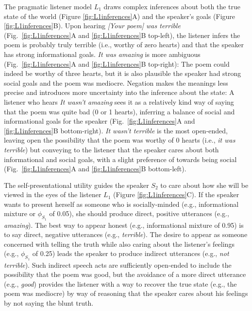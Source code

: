 \documentclass[9pt,twocolumn,twoside,lineno]{main_class_file}
\begin{document}
The pragmatic listener model \(L_1\) draws complex inferences about both the true state of the world (Figure \ref{fig:L1inferences}A) and the speaker's goals (Figure \ref{fig:L1inferences}B).
Upon hearing \emph{{[}Your poem{]} was terrible} (Fig.~\ref{fig:L1inferences}A and \ref{fig:L1inferences}B top-left), the listener infers the poem is probably truly terrible (i.e., worthy of zero hearts) and that the speaker has strong informational goals.
\emph{It was amazing} is more ambiguous (Fig.~\ref{fig:L1inferences}A and \ref{fig:L1inferences}B top-right): The poem could indeed be worthy of three hearts, but it is also plausible the speaker had strong social goals and the poem was mediocre. 
Negation makes the meanings less precise and introduces more uncertainty into the inference about the state: A listener who hears \emph{It wasn't amazing} sees it as a relatively kind way of saying that the poem was quite bad (0 or 1 hearts), inferring a balance of social and informational goals for the speaker (Fig.~\ref{fig:L1inferences}A and \ref{fig:L1inferences}B bottom-right).
\emph{It wasn't terrible} is the most open-ended, leaving open the possibility that the poem was worthy of 0 hearts (i.e., \emph{it was terrible}) but conveying to the listener that the speaker cares about both informational and social goals, with a slight preference of towards being social (Fig.~\ref{fig:L1inferences}A and \ref{fig:L1inferences}B bottom-left). 

The self-presentational utility guides the speaker \(S_2\) to care about how she will be viewed in the eyes of the listener \(L_1\) (Figure \ref{fig:L1inferences}C).
If the speaker wants to present herself as someone who is socially-minded (e.g., informational mixture or $\phi_{S_1}$ of 0.05), she should produce direct, positive utterances (e.g., \emph{amazing}).
The best way to appear honest (e.g., informational mixture of 0.95) is to say direct, negative utterances (e.g., \emph{terrible}).
The desire to appear as someone concerned with telling the truth while also caring about the listener's feelings (e.g., $\phi_{S_1}$ of 0.25) leads the speaker to produce indirect utterances (e.g., \emph{not terrible}).
Such indirect speech acts are sufficiently open-ended to include the
possibility that the poem was good, but the avoidance of a more direct utterance (e.g., \emph{good}) provides the listener with a way to recover the true state (e.g., the poem was mediocre) by way of reasoning that the speaker cares about his feelings by not saying the blunt truth.
\end{document}

